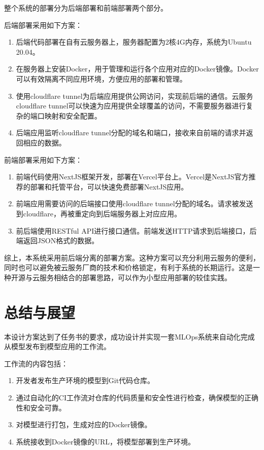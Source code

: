 \documentclass{HDU-Bachelor-Thesis}
\begin{document}
整个系统的部署分为后端部署和前端部署两个部分。

后端部署采用如下方案：

\begin{enumerate}
    \item 后端代码部署在自有云服务器上，服务器配置为2核4G内存，系统为Ubuntu 20.04。
    \item 在服务器上安装Docker，用于管理和运行各个应用对应的Docker镜像。Docker 可以有效隔离不同应用环境，方便应用的部署和管理。
    \item 使用cloudflare tunnel为后端应用提供公网访问，实现前后端的通信。云服务cloudflare tunnel可以快速为应用提供全球覆盖的访问，不需要服务器进行复杂的端口映射和安全配置。
    \item 后端应用监听cloudflare tunnel分配的域名和端口，接收来自前端的请求并返回相应的数据。  
\end{enumerate}

前端部署采用如下方案：

\begin{enumerate}
    \item 前端代码使用NextJS框架开发，部署在Vercel平台上。Vercel是NextJS官方推荐的部署和托管平台，可以快速免费部署NextJS应用。
    \item 前端应用需要访问的后端接口使用cloudflare tunnel分配的域名。请求被发送到cloudflare，再被重定向到后端服务器上对应应用。
    \item 前后端使用RESTful API进行接口通信。前端发送HTTP请求到后端接口，后端返回JSON格式的数据。
\end{enumerate}

综上，本系统采用前后端分离的部署方案。这种方案可以充分利用云服务的便利，同时也可以避免被云服务厂商的技术和价格锁定，有利于系统的长期运行。这是一种开源与云服务相结合的部署思路，可以作为小型应用部署的较佳实践。

\setcounter{table}{0}
\setcounter{figure}{0}
\clearpage
\section{总结与展望}

本设计方案达到了任务书的要求，成功设计并实现一套MLOps系统来自动化完成从模型发布到模型应用的工作流。

工作流的内容包括：

\begin{enumerate}
    \item 开发者发布生产环境的模型到Git代码仓库。
    \item 通过自动化的CI工作流对仓库的代码质量和安全性进行检查，确保模型的正确性和安全可靠。 
    \item 对模型进行打包，生成对应的Docker镜像。
    \item 系统接收到Docker镜像的URL，将模型部署到生产环境。
\end{enumerate}
\end{document}
